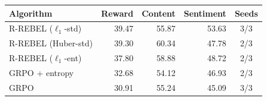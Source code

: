\begin{tabular}{lrrrc}
\toprule
Algorithm & Reward & Content & Sentiment & Seeds \\
\midrule
R-REBEL ($\ell_1$-std) & 39.47 & 55.87 & 53.63 & 3/3 \\
R-REBEL (Huber-std) & 39.30 & 60.34 & 47.78 & 2/3 \\
R-REBEL ($\ell_1$-ent) & 37.80 & 58.88 & 48.72 & 2/3 \\
GRPO + entropy & 32.68 & 54.12 & 46.93 & 2/3 \\
GRPO & 30.91 & 55.24 & 45.09 & 3/3 \\
\bottomrule
\end{tabular}
